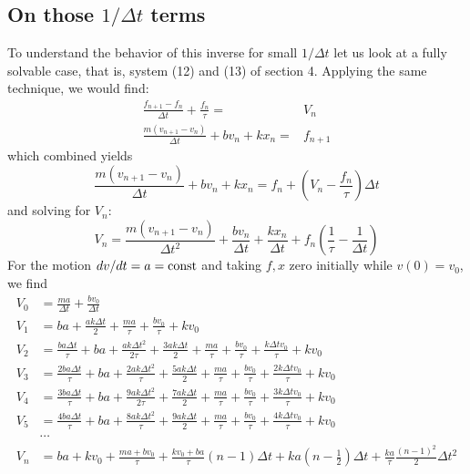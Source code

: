 \documentclass{article}
\begin{document}
\begin{appendix}
\section{On those $1/\Delta t$ terms}
To understand the behavior of this inverse for small $1/\Delta t$ let us look at a fully solvable case, that is, 
system (12) and (13) of section 4. Applying the same technique, we would find:
\begin{align}
\frac{f_{n+1} - f_n}{\Delta t} + \frac{f_n}{\tau} = & V_n\\
\frac{m (v_{n+1}-v_n)}{\Delta t} + b v_n + k x_n =& f_{n+1}
\end{align}
which combined yields
\begin{equation}
\frac{m (v_{n+1}-v_n)}{\Delta t} + b v_n + k x_n = f_n + \left(V_n - \frac{f_n}{\tau}  \right) \Delta t
\end{equation}
and solving for $V_n$:
\begin{equation}
V_n = \frac{m (v_{n+1}-v_n)}{\Delta t^2} + \frac{b v_n}{\Delta t} + \frac{k x_n}{\Delta t}+ f_n \left(\frac{1}{\tau} - \frac{1}{\Delta t}\right)
\end{equation}
For the motion $dv/dt = a = {\rm const}$ and taking $f, x$ zero initially while $v(0)=v_0$, we find
\begin{align*}
V_0 &= \frac{m a}{\Delta t}+\frac{b v_0}{\Delta t}\\
V_1 &= b a+\frac{a k \Delta t}{2}+\frac{m a}{\tau }+\frac{b v_0}{\tau }+k v_0\\
V_2 &= \frac{b a \Delta t}{\tau }+b a+\frac{a k \Delta t^2}{2 \tau }+\frac{3 a k \Delta t}{2}+\frac{m a}{\tau }+\frac{b v_0}{\tau }+\frac{k \Delta t v_0}{\tau }+k v_0\\
V_3 &= \frac{2 b a \Delta t}{\tau }+b a+\frac{2 a k \Delta t^2}{\tau }+\frac{5 a k \Delta t}{2}+\frac{m a}{\tau }+\frac{b v_0}{\tau }+\frac{2 k \Delta t v_0}{\tau }+k v_0\\
V_4 &= \frac{3 b a \Delta t}{\tau }+b a+\frac{9 a k \Delta t^2}{2 \tau }+\frac{7 a k \Delta t}{2}+\frac{m a}{\tau }+\frac{b v_0}{\tau }+\frac{3 k \Delta t v_0}{\tau }+k v_0\\
V_5 &= \frac{4 b a \Delta t}{\tau }+b a+\frac{8 a k \Delta t^2}{\tau }+\frac{9 a k \Delta t}{2}+\frac{m a}{\tau }+\frac{b v_0}{\tau }+\frac{4 k \Delta t v_0}{\tau }+k v_0\\
&\cdots\\
V_n &= b a + k v_0 + \frac{m a + b v_0}{\tau} +  \frac{k v_0 + b a}{\tau} (n-1)\Delta t + k a (n-\frac{1}{2}) \Delta t + \frac{k a}{\tau} \frac{(n-1)^2}{2} \Delta t^2\\

\end{align*}
\end{appendix}
\end{document}
